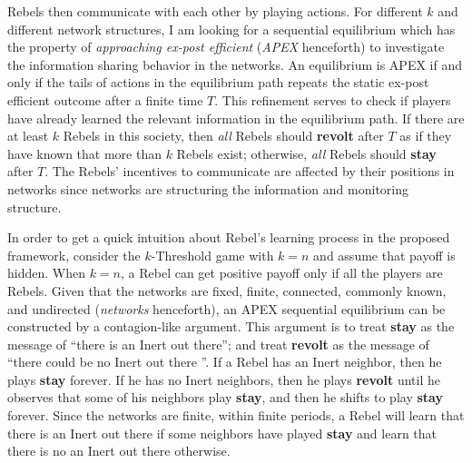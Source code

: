 \documentclass[12pt,letter]{article}
\theoremstyle{definition}
\theoremstyle{remark}
\theoremstyle{claim}
\begin{document}
Rebels then communicate with each other by playing actions. For different $k$ and different network structures, I am looking for a sequential equilibrium which has the property of \textit{approaching ex-post efficient} (\textit{APEX} henceforth) to investigate the information sharing behavior in the networks. An equilibrium is APEX if and only if {the tails of actions in the equilibrium path repeats the static ex-post efficient outcome after a finite time $T$}.  This refinement serves to check if players have already learned the relevant information in the equilibrium path. If there are at least $k$ Rebels in this society, then \textit{all} Rebels should \textbf{revolt} after $T$ as if they have known that more than $k$ Rebels exist; otherwise, \textit{all} Rebels should \textbf{stay} after $T$. The Rebels' incentives to communicate are affected by their positions in networks since networks are structuring the information and monitoring structure.

In order to get a quick intuition about Rebel's learning process in the proposed framework, consider the $k$-Threshold game with $k=n$ and assume that payoff is hidden. When $k=n$, a Rebel can get positive payoff only if all the players are Rebels. Given that the networks are fixed, finite, connected, commonly known, and undirected (\textit{networks} henceforth), an APEX sequential equilibrium can be constructed by a contagion-like argument. This argument is to treat \textbf{stay} as the message of ``there is an Inert out there''; and treat \textbf{revolt} as the message of ``there could be no Inert out there ''. If a Rebel has an Inert neighbor, then he plays \textbf{stay} forever. If he has no Inert neighbors, then he plays \textbf{revolt} until he observes that some of his neighbors play \textbf{stay}, and then he shifts to play \textbf{stay} forever. Since the networks are finite,  within finite periods, a Rebel will learn that there is an Inert out there if some neighbors have played \textbf{stay} and learn that there is no an Inert out there otherwise.
\end{document}
